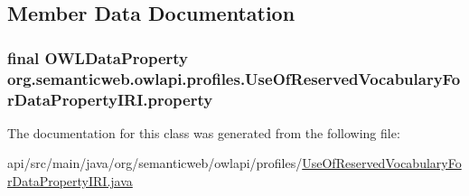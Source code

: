 \subsection{Member Data Documentation}
\hypertarget{classorg_1_1semanticweb_1_1owlapi_1_1profiles_1_1_use_of_reserved_vocabulary_for_data_property_i_r_i_afcf46a6e1202261a6c7f0f49d9e1c7e0}{
\subsubsection[{property}]{\setlength{\rightskip}{0pt plus 5cm}final {\bf O\-W\-L\-Data\-Property} org.\-semanticweb.\-owlapi.\-profiles.\-Use\-Of\-Reserved\-Vocabulary\-For\-Data\-Property\-I\-R\-I.\-property\hspace{0.3cm}{\ttfamily [private]}}}\label{classorg_1_1semanticweb_1_1owlapi_1_1profiles_1_1_use_of_reserved_vocabulary_for_data_property_i_r_i_afcf46a6e1202261a6c7f0f49d9e1c7e0}


The documentation for this class was generated from the following file\-:\begin{DoxyCompactItemize}
\item 
api/src/main/java/org/semanticweb/owlapi/profiles/\hyperlink{_use_of_reserved_vocabulary_for_data_property_i_r_i_8java}{Use\-Of\-Reserved\-Vocabulary\-For\-Data\-Property\-I\-R\-I.\-java}\end{DoxyCompactItemize}
